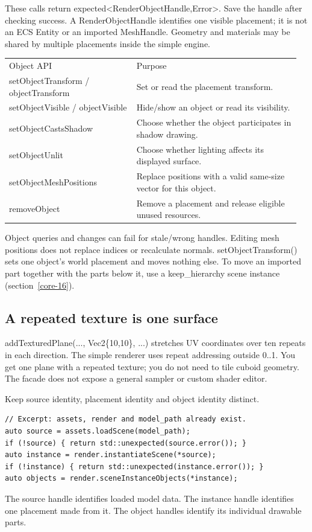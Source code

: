 \documentclass[11pt,a4paper]{article}
\begin{document}
These calls return expected<RenderObjectHandle,Error>. Save the handle after checking success. A RenderObjectHandle identifies one visible placement; it is not an ECS Entity or an imported MeshHandle. Geometry and materials may be shared by multiple placements inside the simple engine.

{\small
\begin{longtable}{@{}p{0.42\linewidth}p{0.54\linewidth}@{}}
Object API & Purpose \\
setObjectTransform / objectTransform & Set or read the placement transform. \\
setObjectVisible / objectVisible & Hide/show an object or read its visibility. \\
setObjectCastsShadow & Choose whether the object participates in shadow drawing. \\
setObjectUnlit & Choose whether lighting affects its displayed surface. \\
setObjectMeshPositions & Replace positions with a valid same-size vector for this object. \\
removeObject & Remove a placement and release eligible unused resources. \\
\end{longtable}
}

Object queries and changes can fail for stale/wrong handles. Editing mesh positions does not replace indices or recalculate normals. setObjectTransform() sets one object's world placement and moves nothing else. To move an imported part together with the parts below it, use a keep\_hierarchy scene instance (section~\ref{core-16}).

\subsection*{A repeated texture is one surface}
addTexturedPlane(..., Vec2\{10,10\}, ...) stretches UV coordinates over ten repeats in each direction. The simple renderer uses repeat addressing outside 0..1. You get one plane with a repeated texture; you do not need to tile cuboid geometry. The facade does not expose a general sampler or custom shader editor.

\label{core-16}
Keep source identity, placement identity and object identity distinct.

\begin{lstlisting}
// Excerpt: assets, render and model_path already exist.
auto source = assets.loadScene(model_path);
if (!source) { return std::unexpected(source.error()); }
auto instance = render.instantiateScene(*source);
if (!instance) { return std::unexpected(instance.error()); }
auto objects = render.sceneInstanceObjects(*instance);
\end{lstlisting}
The source handle identifies loaded model data. The instance handle identifies one placement made from it. The object handles identify its individual drawable parts.
\end{document}
